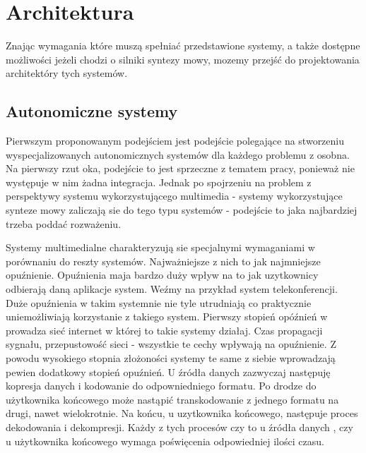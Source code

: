 \section {Architektura}

Znając wymagania które muszą spełniać przedstawione systemy, a także dostępne możliwości jeżeli chodzi o silniki syntezy mowy,  mozemy przejść do projektowania architektóry tych systemów.

\subsection {Autonomiczne systemy}
Pierwszym proponowanym podejściem jest podejście polegające na stworzeniu wyspecjalizowanych autonomicznych systemów dla każdego problemu z osobna. Na pierwszy rzut oka, podejście to jest sprzeczne z tematem pracy, ponieważ nie występuje w nim żadna integracja. Jednak po spojrzeniu na problem z perspektywy systemu wykorzystującego multimedia - systemy wykorzystujące synteze mowy zaliczają sie do tego typu systemów - podejście to jaka najbardziej trzeba poddać rozważeniu.

Systemy multimedialne charakteryzują sie specjalnymi wymaganiami w porównaniu do reszty systemów. Najważniejsze z nich to jak najmniejsze opuźnienie. Opuźnienia maja bardzo duży wpływ na to jak uzytkownicy odbierają daną aplikacje system. Weźmy na przykład system telekonferencji. Duże opuźnienia w takim systemnie nie tyle utrudniają co praktycznie uniemożliwiają korzystanie z takiego system. Pierwszy stopień opóźnień w prowadza sieć internet w której to takie systemy działaj. Czas propagacji sygnału, przepustowość sieci - wszystkie te cechy wpływają na opuźnienie. Z powodu wysokiego stopnia złożoności systemy te same z siebie wprowadzają pewien dodatkowy stopień opuźnień. U źródła danych zazwyczaj następuję kopresja danych i kodowanie do odpowniedniego formatu. Po drodze do użytkownika końcowego może nastąpić transkodowanie z jednego formatu na drugi, nawet wielokrotnie. Na końcu, u uzytkownika końcowego, następuje proces dekodowania i dekompresji. Każdy z tych procesów czy to u źródła danych , czy u użytkownika końcowego wymaga poświęcenia odpowiedniej ilości czasu. 

